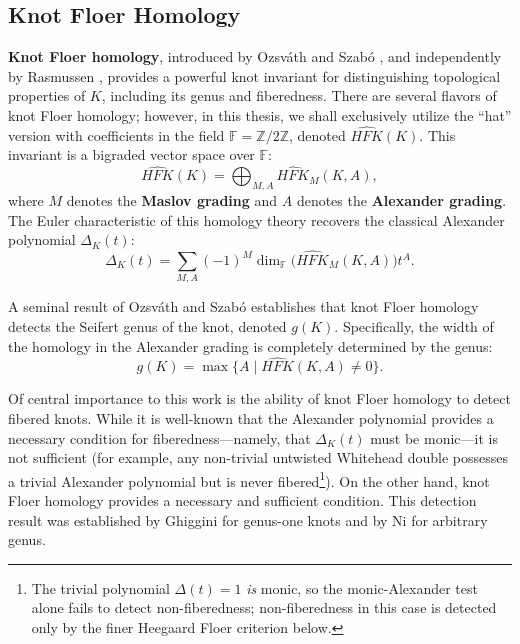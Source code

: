 \subsection*{Knot Floer Homology}
\textbf{Knot Floer homology}, introduced by Ozsv\'ath and Szab\'o \cite{OS04Knot}, and independently by Rasmussen \cite{Ras03}, provides a powerful knot invariant for distinguishing topological properties of $K$, including its genus and fiberedness. There are several flavors of knot Floer homology; however, in this thesis, we shall exclusively utilize the ``hat'' version with coefficients in the field $\mathbb{F} = \mathbb{Z}/2\mathbb{Z}$, denoted $\widehat{HFK}(K)$. This invariant is a bigraded vector space over $\mathbb{F}$:
\begin{equation}
    \widehat{HFK}(K) = \bigoplus_{M, A} \widehat{HFK}_M(K, A),
\end{equation}
where $M$ denotes the \textbf{Maslov grading} and $A$ denotes the \textbf{Alexander grading}. The Euler characteristic of this homology theory recovers the classical Alexander polynomial $\Delta_K(t)$:
\begin{equation}
    \Delta_K(t) = \sum_{M, A} (-1)^M \dim_{\mathbb{F}} \big( \widehat{HFK}_M(K, A) \big) t^A.
\end{equation}

A seminal result of Ozsv\'ath and Szab\'o establishes that knot Floer homology detects the Seifert genus of the knot, denoted $g(K)$. Specifically, the width of the homology in the Alexander grading is completely determined by the genus:
\begin{equation}\label{eq:ozvath-szabo genus top grading}
    g(K) = \max \{ A \mid \widehat{HFK}(K, A) \neq 0 \}.
\end{equation}

Of central importance to this work is the ability of knot Floer homology to detect fibered knots. While it is well-known that the Alexander polynomial provides a necessary condition for fiberedness---namely, that $\Delta_K(t)$ must be monic---it is not sufficient (for example, any non-trivial untwisted Whitehead double possesses a trivial Alexander polynomial but is never fibered\footnote{The trivial polynomial $\Delta(t) = 1$ \emph{is} monic, so the monic-Alexander test alone fails to detect non-fiberedness; non-fiberedness in this case is detected only by the finer Heegaard Floer criterion below.}). On the other hand, knot Floer homology provides a necessary and sufficient condition. This detection result was established by Ghiggini \cite{Ghi08} for genus-one knots and by Ni \cite{Ni07} for arbitrary genus.

